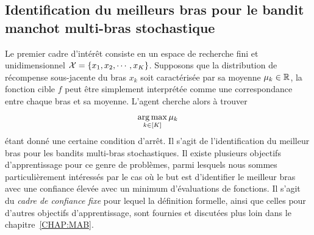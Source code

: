 
\subsection{Identification du meilleurs bras pour le bandit manchot multi-bras stochastique}\label{sec:abs.mab.bai}

Le premier cadre d'intérêt consiste en un espace de recherche fini et unidimensionnel $\mathcal{X} = \{x_1,x_2,\cdots,x_K\}$. Supposons que la distribution de récompense sous-jacente du bras $x_k$ soit caractérisée par sa moyenne $\mu_k\in\mathbb{R}$, la fonction cible $f$ peut être simplement interprétée comme une correspondance entre chaque bras et sa moyenne. L'agent cherche alors à trouver
\begin{align}\label{eq:abs.optim_bai}
    \operatorname*{arg\,max}_{k\in[K]} \mu_k\,
\end{align}
étant donné une certaine condition d'arrêt. Il s'agit de l'identification du meilleur bras pour les bandits multi-bras stochastiques. Il existe plusieurs objectifs d'apprentissage pour ce genre de problèmes, parmi lesquels nous sommes particulièrement intéressés par le cas où le but est d'identifier le meilleur bras avec une confiance élevée avec un minimum d'évaluations de fonctions. Il s'agit du \emph{cadre de confiance fixe} pour lequel la définition formelle, ainsi que celles pour d'autres objectifs d'apprentissage, sont fournies et discutées plus loin dans le chapitre~\ref{CHAP:MAB}.

